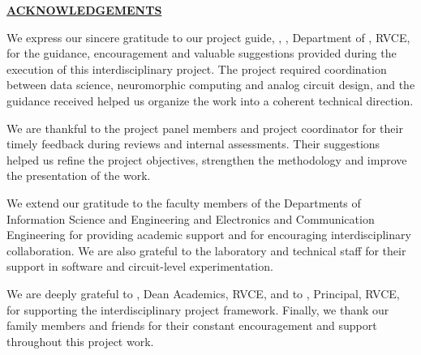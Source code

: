 \thispagestyle{empty}
\vspace{-1cm}
\begin{center}
	\Large\textbf{\underline{ACKNOWLEDGEMENTS}} \par
\end{center}

We express our sincere gratitude to our project guide, \textbf{\printGuideNameA}, \printGuideDesigA, Department of \printGuideDeptAInSF, RVCE, for the guidance, encouragement and valuable suggestions provided during the execution of this interdisciplinary project. The project required coordination between data science, neuromorphic computing and analog circuit design, and the guidance received helped us organize the work into a coherent technical direction.\\ \par

We are thankful to the project panel members and project coordinator for their timely feedback during reviews and internal assessments. Their suggestions helped us refine the project objectives, strengthen the methodology and improve the presentation of the work.\\ \par

We extend our gratitude to the faculty members of the Departments of Information Science and Engineering and Electronics and Communication Engineering for providing academic support and for encouraging interdisciplinary collaboration. We are also grateful to the laboratory and technical staff for their support in software and circuit-level experimentation.\\ \par

We are deeply grateful to \textbf{\printDA}, Dean Academics, RVCE, and to \textbf{\printPrincipal}, Principal, RVCE, for supporting the interdisciplinary project framework. Finally, we thank our family members and friends for their constant encouragement and support throughout this project work.\\ \par
